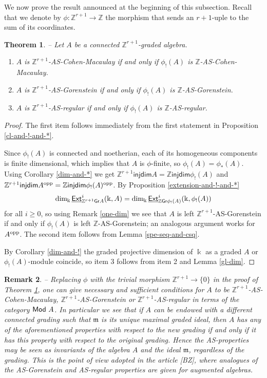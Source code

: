 \documentclass[twoside,11pt]{article}
\renewcommand{\k}{\Bbbk}
\newcommand{\Z}{{\mathbb Z}}
\newcommand{\m}{{\mathfrak m}}
\newcommand{\Mod}{{\sf Mod}}
\newcommand{\GrMod}{{\sf Gr}}
\newcommand{\EXT}{\underline{\sf Ext}}
\newcommand{\opp}{{\rm opp}}
\newcommand{\injdim}{\mathsf{injdim}}
\newtheorem{subtheorem}{Theorem}[subsection]
\newtheorem{subremark}[subtheorem]{Remark}
\begin{document}
We now prove the result announced at the beginning of this subsection. Recall that we
denote by $\phi: \Z^{r+1}\to \Z$ the morphism that sends an $r+1$-uple to the sum of its
coordinates. 
\begin{subtheorem} -- \label{AS-regrading}
Let $A$ be a connected $\Z^{r+1}$-graded algebra.
\begin{enumerate}
\item $A$ is $\Z^{r+1}$-AS-Cohen-Macaulay if and only if $\phi_!(A)$ is
	$\Z$-AS-Cohen-Macaulay.

\item $A$ is $\Z^{r+1}$-AS-Gorenstein if and only if $\phi_!(A)$ is $\Z$-AS-Gorenstein.

\item $A$ is $\Z^{r+1}$-AS-regular if and only if $\phi_!(A)$ is $\Z$-AS-regular.
\end{enumerate}
\end{subtheorem}

\begin{proof} The first item follows immediately from the first statement in Proposition
\ref{cl-and-!-and-*}.

Since $\phi_!(A)$ is connected and noetherian, each of its homogeneous components is
finite dimensional, which implies that $A$ is $\phi$-finite, so $\phi_!(A) = \phi_*(A)$.
Using Corollary \ref{dim-and-*} we get $\Z^{r+1} \injdim A =
\Z \injdim \phi_!(A)$ and $\Z^{r+1} \injdim A^\opp = \Z \injdim
\phi_!(A)^\opp$. By Proposition \ref{extension-and-!-and-*} 
\[
\dim_\k \EXT_{\Z^{r+1}\GrMod A}^i(\k, A) = \dim_\k
\EXT_{\Z\GrMod \phi_!(A)}^i(\k, \phi_!(A))
\] 
for all $i \geq 0$, so using Remark \ref{one-dim} we see that $A$ is left
$\Z^{r+1}$-AS-Gorenstein if and only if $\phi_!(A)$ is left $\Z$-AS-Gorenstein; an
analogous argument works for $A^\opp$. The second item follows from Lemma
\ref{spe-seq-and-csq}.

By Corollary \ref{dim-and-!} the graded projective dimension of $\k$ as a graded $A$ or
$\phi_!(A)$-module coincide, so item 3 follows from item 2 and Lemma \ref{gl-dim}.
\end{proof}
\begin{subremark} -- \rm
\label{trivial-change-of-grading}
Replacing $\phi$ with the trivial morphism $\Z^{r+1} \to \{0\}$ in the proof of Theorem
\ref{AS-regrading}, one can give necessary and sufficient conditions for $A$ to be
$\Z^{r+1}$-AS-Cohen-Macaulay, $\Z^{r+1}$-AS-Gorenstein or $\Z^{r+1}$-AS-regular in terms
of the category $\Mod~A$. In particular we see that if $A$ can be endowed with a different
connected grading such that $\m$ is its unique maximal graded ideal, then $A$ has any of
the aforementioned properties with respect to the new grading if and only if it has this
property with respect to the original grading. Hence the AS-properties may be seen as
invariants of the algebra $A$ and the ideal $\m$, regardless of the grading. This is the
point of view adopted in the article [BZ], where analogues of the AS-Gorenstein and
AS-regular properties are given for augmented algebras.
\end{subremark}
\end{document}
